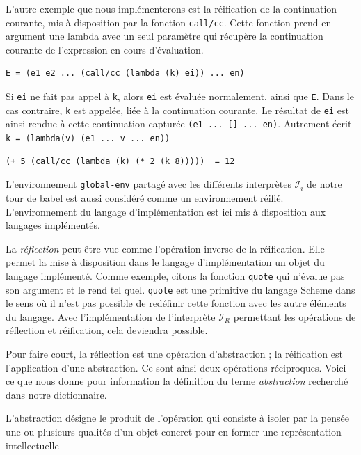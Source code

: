 L'autre exemple que nous implémenterons est la réification de la continuation courante, mis à disposition
par la fonction \texttt{call/cc}. Cette fonction prend en argument une lambda avec un seul paramètre qui récupère la
continuation courante de l'expression en cours d'évaluation.
\begin{verbatim}
E = (e1 e2 ... (call/cc (lambda (k) ei)) ... en)	
\end{verbatim}
  Si \texttt{ei} ne fait pas appel à \texttt{k}, alors \texttt{ei} est évaluée normalement, ainsi que \texttt{E}. 
Dans le cas contraire, \texttt{k} est appelée, liée à la continuation courante. Le résultat de \texttt{ei} est ainsi rendue
à cette continuation capturée \texttt{(e1 ... [] ... en)}. Autrement écrit \texttt{k = (lambda(v) (e1 ... v ... en))}
\begin{verbatim}
(+ 5 (call/cc (lambda (k) (* 2 (k 8)))))  = 12
\end{verbatim} 


L'environnement \texttt{global-env} partagé avec les différents interprètes $\mathcal{I}_i$ de notre tour de babel est aussi considéré
comme un environnement réifié. L'environnement du langage d'implémentation est ici mis à disposition aux langages implémentés.


La \textit{réflection} peut être vue comme l'opération inverse de la réification.
Elle permet la mise à disposition dans le langage d'implémentation un objet du langage implémenté.
Comme exemple, citons la fonction \texttt{quote} qui n'évalue pas son argument et le rend tel quel. \texttt{quote} est
 une primitive du langage Scheme dans le 
sens où il n'est pas possible  de redéfinir cette fonction avec les autre éléments du langage.
Avec l'implémentation de l'interprète $\mathcal{I}_R$ permettant les opérations de réflection et réification,
 cela deviendra possible. 

Pour faire court, la réflection est une opération d'abstraction ; la réification est l'application d'une abstraction.
Ce sont ainsi deux opérations réciproques. 
Voici ce que nous donne pour information la définition du terme \textit{abstraction} recherché dans notre dictionnaire.
\begin{definition}
  L'abstraction désigne le produit de l'opération qui consiste à isoler par la pensée une ou plusieurs qualités d'un objet
  concret pour en former une représentation intellectuelle
    
\end{definition} 

\vspace{0.5cm}

